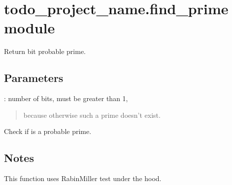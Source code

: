 \documentclass[letterpaper,10pt,english]{sphinxmanual}
\begin{document}
\section{todo\_project\_name.find\_prime module}
\label{\detokenize{todo_project_name:module-todo_project_name.find_prime}}\label{\detokenize{todo_project_name:todo-project-name-find-prime-module}}

\begin{fulllineitems}
\label{\detokenize{todo_project_name:todo_project_name.find_prime.find_prime}}
\pysigstartsignatures
{}
\pysigstopsignatures
\sphinxAtStartPar
Return \sphinxhyphen{}bit probable prime.


\subsection{Parameters}
\label{\detokenize{todo_project_name:id2}}
\sphinxAtStartPar
{}
: number of bits, must be greater than 1,
\begin{quote}

\sphinxAtStartPar
because otherwise such a prime doesn’t exist.
\end{quote}

\end{fulllineitems}


\begin{fulllineitems}
\label{\detokenize{todo_project_name:todo_project_name.find_prime.is_probable_prime}}
\pysigstartsignatures
{}
\pysigstopsignatures
\sphinxAtStartPar
Check if  is a probable prime.


\subsection{Notes}
\label{\detokenize{todo_project_name:notes}}
\sphinxAtStartPar
This function uses Rabin\sphinxhyphen{}Miller test under the hood.

\end{fulllineitems}
\end{document}
